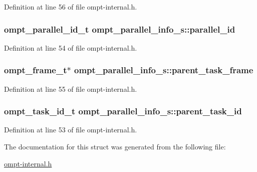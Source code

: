 Definition at line 56 of file ompt-\/internal.\-h.

\hypertarget{structompt__parallel__info__s_ae6048ad408a97960d4bff5630e4cf9df}{
\subsubsection[{parallel\-\_\-id}]{\setlength{\rightskip}{0pt plus 5cm}ompt\-\_\-parallel\-\_\-id\-\_\-t ompt\-\_\-parallel\-\_\-info\-\_\-s\-::parallel\-\_\-id}}\label{structompt__parallel__info__s_ae6048ad408a97960d4bff5630e4cf9df}


Definition at line 54 of file ompt-\/internal.\-h.

\hypertarget{structompt__parallel__info__s_a2801b33cdc3811de76067d83e8d987cc}{
\subsubsection[{parent\-\_\-task\-\_\-frame}]{\setlength{\rightskip}{0pt plus 5cm}ompt\-\_\-frame\-\_\-t$\ast$ ompt\-\_\-parallel\-\_\-info\-\_\-s\-::parent\-\_\-task\-\_\-frame}}\label{structompt__parallel__info__s_a2801b33cdc3811de76067d83e8d987cc}


Definition at line 55 of file ompt-\/internal.\-h.

\hypertarget{structompt__parallel__info__s_a5aecacfb100ffc512bc03698eb14023a}{
\subsubsection[{parent\-\_\-task\-\_\-id}]{\setlength{\rightskip}{0pt plus 5cm}ompt\-\_\-task\-\_\-id\-\_\-t ompt\-\_\-parallel\-\_\-info\-\_\-s\-::parent\-\_\-task\-\_\-id}}\label{structompt__parallel__info__s_a5aecacfb100ffc512bc03698eb14023a}


Definition at line 53 of file ompt-\/internal.\-h.



The documentation for this struct was generated from the following file\-:\begin{DoxyCompactItemize}
\item 
\hyperlink{ompt-internal_8h}{ompt-\/internal.\-h}\end{DoxyCompactItemize}
